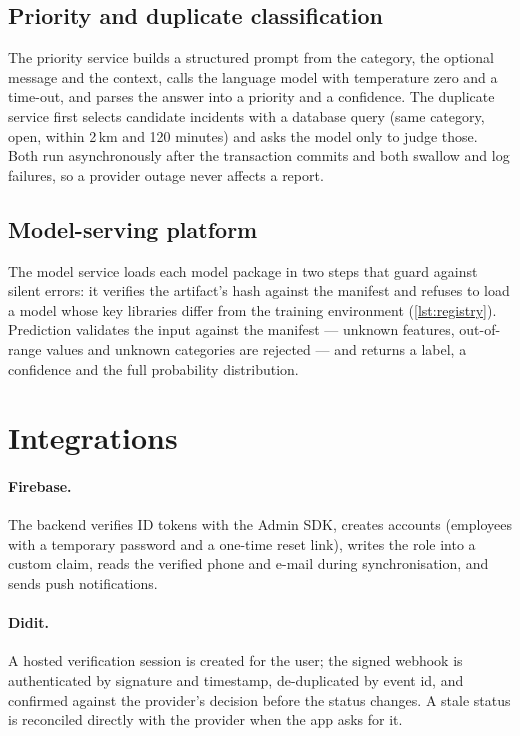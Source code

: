 \subsection{Priority and duplicate classification}
The priority service builds a structured prompt from the category, the optional message and the context, calls the
language model with temperature zero and a time-out, and parses the answer into a priority and a confidence. The
duplicate service first selects candidate incidents with a database query (same category, open, within 2\,km and 120
minutes) and asks the model only to judge those. Both run asynchronously after the transaction commits and both swallow
and log failures, so a provider outage never affects a report.

\subsection{Model-serving platform}
The model service loads each model package in two steps that guard against silent errors: it verifies the artifact's hash
against the manifest and refuses to load a model whose key libraries differ from the training environment
(\cref{lst:registry}). Prediction validates the input against the manifest --- unknown features, out-of-range values and
unknown categories are rejected --- and returns a label, a confidence and the full probability distribution.



\section{Integrations}

\paragraph{Firebase.} The backend verifies ID tokens with the Admin SDK, creates accounts (employees with a temporary
password and a one-time reset link), writes the role into a custom claim, reads the verified phone and e-mail during
synchronisation, and sends push notifications.
\paragraph{Didit.} A hosted verification session is created for the user; the signed webhook is authenticated by signature
and timestamp, de-duplicated by event id, and confirmed against the provider's decision before the status changes. A stale
status is reconciled directly with the provider when the app asks for it.
